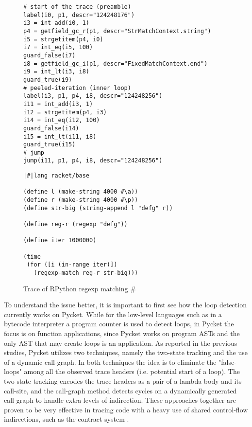 \begin{wrapfigure}[26]{r}{0.40\textwidth}
    \vspace{-0.3cm}
    \centering
    \begin{minipage}[t]{0.38\textwidth}
      \begin{verbatim}
# start of the trace (preamble)
label(i0, p1, descr="124248176")
i3 = int_add(i0, 1)
p4 = getfield_gc_r(p1, descr="StrMatchContext.string")
i5 = strgetitem(p4, i0)
i7 = int_eq(i5, 100)
guard_false(i7)
i8 = getfield_gc_i(p1, descr="FixedMatchContext.end")
i9 = int_lt(i3, i8)
guard_true(i9)
# peeled-iteration (inner loop)
label(i3, p1, p4, i8, descr="124248256")
i11 = int_add(i3, 1)
i12 = strgetitem(p4, i3)
i14 = int_eq(i12, 100)
guard_false(i14)
i15 = int_lt(i11, i8)
guard_true(i15)
# jump
jump(i11, p1, p4, i8, descr="124248256")
    \end{verbatim}
    \end{minipage}
    \begin{minipage}[t]{0.38\textwidth}
      \begin{verbatim}
|#|lang racket/base

(define l (make-string 4000 #\a))
(define r (make-string 4000 #\p))
(define str-big (string-append l "defg" r))

(define reg-r (regexp "defg"))

(define iter 1000000)

(time
 (for ([i (in-range iter)])
   (regexp-match reg-r str-big)))
    \end{verbatim}
    \end{minipage}
    \caption{\small Trace of RPython regexp matching $\mathtt{\#}$}
    \label{fig:regexp-trace}
  \end{wrapfigure}

To understand the issue better, it is important to first see how the
loop detection currently works on Pycket. While for the low-level
languages such as in a bytecode interpreter a program counter is used
to detect loops, in Pycket the focus is on function applications,
since Pycket works on program ASTs and the only AST that may create
loops is an application. As reported in the previous studies, Pycket
utilizes two techniques, namely the two-state tracking and the use of
a dynamic call-graph. In both techniques the idea is to eliminate the
"false-loops" among all the observed trace headers (i.e. potential
start of a loop). The two-state tracking encodes the trace headers as
a pair of a lambda body and its call-site, and the call-graph method
detects cycles on a dynamically generated call-graph to handle extra
levels of indirection. These approaches together are proven to be very
effective in tracing code with a heavy use of shared control-flow
indirections, such as the contract system \cite{pycket15,pycket17}.

